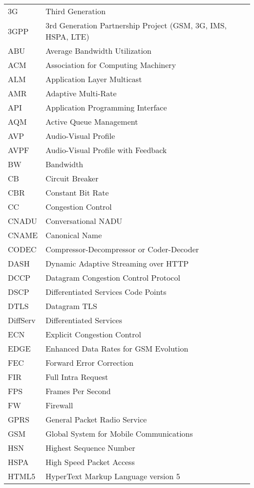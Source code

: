 \begin{longtable}{ll}
3G  	& Third Generation \\
3GPP 	& 3rd Generation Partnership Project (GSM, 3G, IMS, HSPA, LTE)\\
ABU 	& Average Bandwidth Utilization \\
ACM 	& Association for Computing Machinery \\
ALM 	& Application Layer Multicast \\
AMR 	& Adaptive Multi-Rate \\
API 	& Application Programming Interface \\
AQM 	& Active Queue Management \\
AVP 	& Audio-Visual Profile \\
AVPF	& Audio-Visual Profile with Feedback \\
BW  	& Bandwidth \\
CB  	& Circuit Breaker \\
CBR 	& Constant Bit Rate \\
CC  	& Congestion Control \\
CNADU	& Conversational NADU \\
CNAME	& Canonical Name \\
CODEC	& Compressor-Decompressor or Coder-Decoder \\
DASH 	& Dynamic Adaptive Streaming over HTTP \\
DCCP 	& Datagram Congestion Control Protocol \\
DSCP 	& Differentiated Services Code Points \\
DTLS 	& Datagram TLS \\
DiffServ	& Differentiated Services \\
ECN  	& Explicit Congestion Control \\
EDGE 	& Enhanced Data Rates for GSM Evolution \\
FEC  	& Forward Error Correction \\
FIR 	& Full Intra Request \\
FPS 	& Frames Per Second \\
FW  	& Firewall \\
GPRS 	& General Packet Radio Service \\
GSM 	& Global System for Mobile Communications \\
HSN 	& Highest Sequence Number \\
HSPA 	& High Speed Packet Access \\
HTML5	& HyperText Markup Language version 5\\

\end{longtable}
